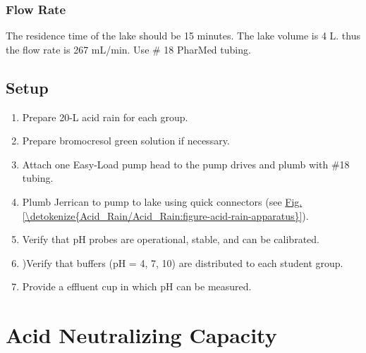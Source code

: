 \documentclass[letterpaper,10pt,english]{sphinxmanual}
\begin{document}
\subsection{Flow Rate}
\label{\detokenize{Acid_Rain/Acid_Rain:flow-rate}}
The residence time of the lake should be 15 minutes. The lake volume is 4 L. thus the flow rate is 267 mL/min. Use \# 18 PharMed tubing.


\section{Setup}
\label{\detokenize{Acid_Rain/Acid_Rain:setup}}\label{\detokenize{Acid_Rain/Acid_Rain:heading-acid-rain-setup}}\begin{enumerate}
\item {} 
Prepare 20-L acid rain for each group.

\item {} 
Prepare bromocresol green solution if necessary.

\item {} 
Attach one Easy-Load pump head to the pump drives and plumb with \#18 tubing.

\item {} 
Plumb Jerrican to pump to lake using quick connectors (see \hyperref[\detokenize{Acid_Rain/Acid_Rain:figure-acid-rain-apparatus}]{Fig.\@ \ref{\detokenize{Acid_Rain/Acid_Rain:figure-acid-rain-apparatus}}}).

\item {} 
Verify that pH probes are operational, stable, and can be calibrated.

\item {} 
)Verify that buffers (pH = 4, 7, 10) are distributed to each student group.

\item {} 
Provide a effluent cup in which pH can be measured.

\end{enumerate}


\chapter{Acid Neutralizing Capacity}
\label{\detokenize{Acid_Neutralizing_Capacity/Acid_Neutralizing_Capacity:acid-neutralizing-capacity}}\label{\detokenize{Acid_Neutralizing_Capacity/Acid_Neutralizing_Capacity:title-acid-neutralizing-capacity}}\label{\detokenize{Acid_Neutralizing_Capacity/Acid_Neutralizing_Capacity::doc}}
\end{document}
